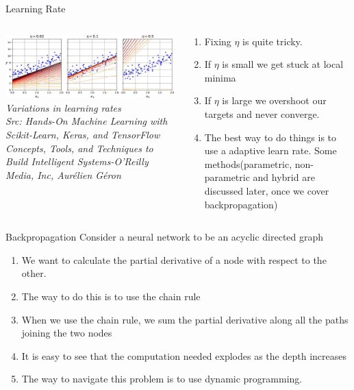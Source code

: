 \begin{frame}{Learning Rate}
  \begin{columns}[T]
  \begin{column}{0.4\textwidth}
	\includegraphics[width=1.1\textwidth]{images/learning rate.jpeg}
	\tiny{\textit{Variations in learning rates\\ Src: Hands-On Machine Learning with Scikit-Learn, Keras, and TensorFlow  Concepts, Tools, and Techniques to Build Intelligent Systems-O'Reilly Media, Inc, Aurélien Géron }}
  \end{column}
  \begin{column}{0.6\textwidth}
  \begin{enumerate}[$\bullet$]
  \item Fixing $\eta$ is quite tricky.\pause
  \item If $\eta$ is small we get stuck at local minima\pause
  \item If $\eta$ is large we overshoot our targets and never converge.
  \item The best way to do things is to use a adaptive learn rate. Some methods(parametric, non-parametric and hybrid are discussed later, once we cover backpropagation)
  \end{enumerate}
  \end{column}
\end{columns}
\end{frame}


\begin{frame}{Backpropagation}
  Consider a neural network to be an acyclic directed graph
  \begin{enumerate}[$\bullet$]
  \item We want to calculate the partial derivative of a node with respect to the other.\pause
  \item The way to do this is to use the chain rule\pause
  \item When we use the chain rule, we sum the partial derivative along all the paths joining the two nodes
  \item It is easy to see that the computation needed explodes as the depth increases
  \item The way to navigate this problem is to use dynamic programming.
  \end{enumerate}
\end{frame}

